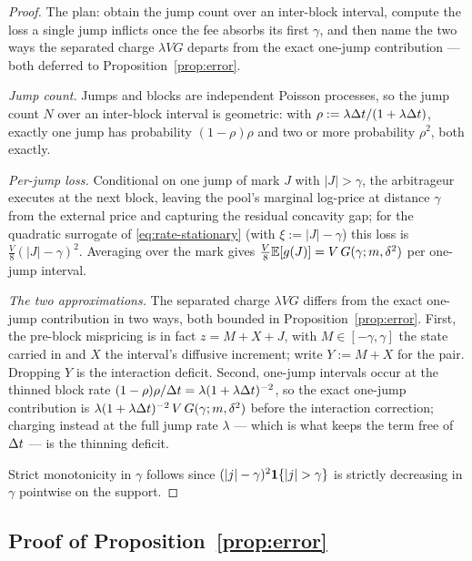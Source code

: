 \begin{proof}
The plan: obtain the jump count over an inter-block interval, compute the loss a single jump inflicts once the fee absorbs its first $\gamma$, and then name the two ways the separated charge $\lambda VG$ departs from the exact one-jump contribution --- both deferred to Proposition~\ref{prop:error}.

\emph{Jump count.} Jumps and blocks are independent Poisson processes, so the jump count $N$ over an inter-block interval is geometric: with $\rho:=\lambda\Delta t/(1+\lambda\Delta t)$, exactly one jump has probability $(1-\rho)\rho$ and two or more probability $\rho^2$, both exactly. 

\emph{Per-jump loss.} Conditional on one jump of mark $J$ with $|J|>\gamma$, the arbitrageur executes at the next block, leaving the pool's marginal log-price at distance $\gamma$ from the external price and capturing the residual concavity gap; for the quadratic surrogate of \eqref{eq:rate-stationary} (with $\xi := |J|-\gamma$) this loss is $\tfrac{V}{8}(|J|-\gamma)^2$. Averaging over the mark gives $\tfrac{V}{8}\mathbb{E}[g(J)] = V\,G(\gamma;m,\delta^2)$ per one-jump interval.

\emph{The two approximations.} The separated charge $\lambda V G$ differs from the exact one-jump contribution in two ways, both bounded in Proposition~\ref{prop:error}. First, the pre-block mispricing is in fact $z = M + X + J$, with $M\in[-\gamma,\gamma]$ the state carried in and $X$ the interval's diffusive increment; write $Y := M+X$ for the pair. Dropping $Y$ is the interaction deficit. Second, one-jump intervals occur at the thinned block rate $(1-\rho)\rho/\Delta t = \lambda(1+\lambda\Delta t)^{-2}$, so the exact one-jump contribution is $\lambda(1+\lambda\Delta t)^{-2}\,V\,G(\gamma;m,\delta^2)$ before the interaction correction; charging instead at the full jump rate $\lambda$ --- which is what keeps the term free of $\Delta t$ --- is the thinning deficit.

Strict monotonicity in $\gamma$ follows since $(|j|-\gamma)^2 \1\{|j|>\gamma\}$ is strictly decreasing in $\gamma$ pointwise on the support.
\end{proof}

\subsection{Proof of Proposition~\ref{prop:error}}\label{app:error}

